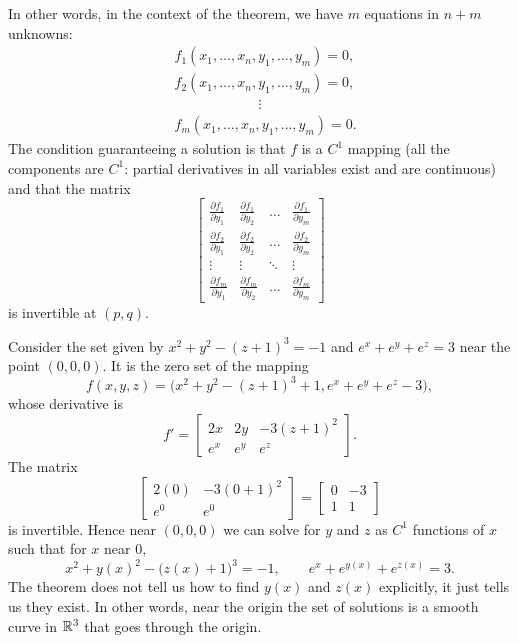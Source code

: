 In other words, in the context of the theorem, we have
$m$ equations in $n+m$ unknowns:
\begin{align*}
& f_1 (x_1,\ldots,x_n,y_1,\ldots,y_m) = 0 , \\
& f_2 (x_1,\ldots,x_n,y_1,\ldots,y_m) = 0 , \\
& \qquad \qquad \qquad  \vdots \\
& f_m (x_1,\ldots,x_n,y_1,\ldots,y_m) = 0 .
\end{align*}
The condition guaranteeing a solution is that $f$ is a $C^1$ mapping
(all the components are
$C^1$: partial derivatives in all variables exist
and are continuous) and that the matrix
\begin{equation*}
\begin{bmatrix}
\frac{\partial f_1}{\partial y_1}
&
\frac{\partial f_1}{\partial y_2}
& \ldots &
\frac{\partial f_1}{\partial y_m}
\\[6pt]
\frac{\partial f_2}{\partial y_1}
&
\frac{\partial f_2}{\partial y_2}
& \ldots &
\frac{\partial f_2}{\partial y_m}
\\
\vdots & \vdots & \ddots & \vdots
\\
\frac{\partial f_m}{\partial y_1}
&
\frac{\partial f_m}{\partial y_2}
& \ldots &
\frac{\partial f_m}{\partial y_m}
\end{bmatrix}
\end{equation*}
is invertible at $(p,q)$.

\begin{example}
Consider the set given by $x^2+y^2-{(z+1)}^3 = -1$ and $e^x+e^y+e^z = 3$
near the point $(0,0,0)$.
It is the zero set of the mapping
\begin{equation*}
f(x,y,z) = \bigl(x^2+y^2-{(z+1)}^3+1,e^x+e^y+e^z-3\bigr) ,
\end{equation*}
whose derivative is
\begin{equation*}
f' =
\begin{bmatrix}
2x & 2y & -3{(z+1)}^2 \\
e^x & e^y & e^z
\end{bmatrix} .
\end{equation*}
The matrix
\begin{equation*}
\begin{bmatrix}
2(0) & -3{(0+1)}^2 \\
e^0 & e^0
\end{bmatrix}
=
\begin{bmatrix}
0 & -3 \\
1 & 1
\end{bmatrix}
\end{equation*}
is invertible.  Hence near $(0,0,0)$ we can solve for $y$ and $z$
as $C^1$ functions of $x$ such that for $x$ near $0$,
\begin{equation*}
x^2+y(x)^2-{\bigl(z(x)+1\bigr)}^3 = -1,
\qquad
e^x+e^{y(x)}+e^{z(x)} = 3 .
\end{equation*}
The theorem does not tell us how to find $y(x)$ and $z(x)$ explicitly,
it just tells us they exist.
In other words, near the origin the set of solutions is a
smooth curve in ${\mathbb{R}}^3$ that goes through the origin.
\end{example}

